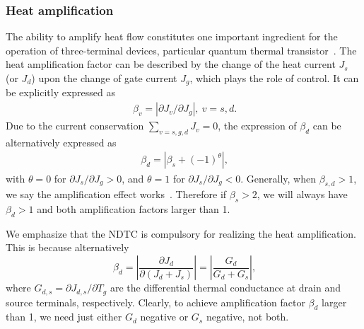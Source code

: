 \documentclass[twocolumn,preprintnumbers,amsmath,amssymb]{revtex4}
\begin{document}
\subsubsection{Heat amplification}

The ability to amplify heat flow constitutes one important ingredient for the operation of three-terminal devices,
particular quantum thermal transistor~\cite{nbli2012rmp,prl2014pbabdallah,kjoulain2016prl}.
The heat amplification factor can be described by the change of the heat current $J_s$ (or $J_d$) upon
the change of gate current $J_g$, which plays the role of control.
It can be explicitly expressed as
\begin{eqnarray}~\label{factor}
\beta_v=|{\partial}J_{v}/{\partial}J_g|,~v=s,d.
\end{eqnarray}
Due to the current conservation $\sum_{v=s,g,d}J_v=0$, the expression of $\beta_d$ can be alternatively expressed as
\begin{eqnarray}~\label{betad}
\beta_d=|\beta_s+(-1)^{\theta}|,
\end{eqnarray}
with $\theta=0$ for $\partial J_s/\partial J_g>0$, and $\theta=1$ for $\partial J_s/\partial J_g<0$.
Generally, when $\beta_{s,d}>1$, we say the amplification effect works~\cite{nbli2012rmp}. Therefore if $\beta_s>2$, we will always have $\beta_d>1$ and both amplification factors larger than 1.

We emphasize that the NDTC is compulsory for realizing the heat amplification. This is because alternatively
\begin{equation}~\label{betad2}
\beta_d=\left|\frac{\partial J_d}{\partial(J_d+J_s)}\right|=\left|\frac{G_d}{G_d+G_s}\right|,
\end{equation}
where $G_{d,s}=\partial J_{d,s}/\partial T_g$ are the differential thermal conductance at drain and source terminals, respectively. Clearly, to achieve amplification factor $\beta_d$ larger than 1, we need just either $G_d$ negative or $G_s$ negative, not both.
\end{document}
